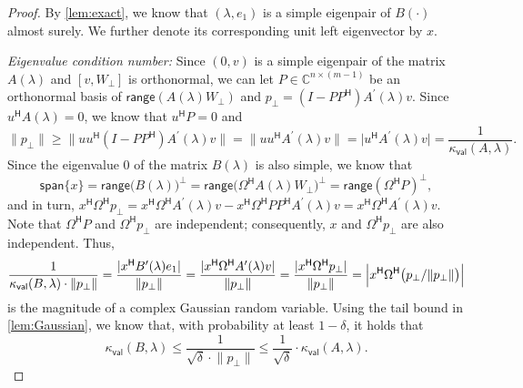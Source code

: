 \documentclass[a4paper,11pt]{article}
\newcommand{\Htran}{\mathsf{H}}
\newcommand{\C}{\mathbb{C}}
\newcommand{\range}{\mathsf{range}}
\newcommand{\kval}{\kappa_{\mathsf{val}}}
\providecommand{\spa}[1]{\mathsf{span}\{#1\}}
\providecommand{\abs}[1]{\lvert#1\rvert}
\providecommand{\norm}[1]{\lVert#1\rVert}
\providecommand{\Bigabs}[1]{\Bigl\lvert#1\Bigr\rvert}
\begin{document}
\begin{proof}
    By \cref{lem:exact}, we know that $(\lambda,e_{1})$ is a simple eigenpair of $B(\cdot)$ almost surely. We further denote its corresponding unit left eigenvector by $x$.
    
    \emph{Eigenvalue condition number:}
    Since $(0,v)$ is a simple eigenpair of the matrix $A(\lambda)$ and $[v,W_{\perp}]$ is orthonormal, we can let $P\in\C^{n\times (m-1)}$ be an orthonormal basis of $\range(A(\lambda)W_{\perp})$ and $p_{\perp} = (I-PP^{\Htran})A^{\prime}(\lambda)v$. Since $u^{\Htran}A(\lambda)=0$, we know that $u^{\Htran}P=0$ and 
    \begin{equation*}
        \norm{p_{\perp}} \geq \norm{uu^{\Htran}(I-PP^{\Htran})A^{\prime}(\lambda)v}= \norm{uu^{\Htran}A^{\prime}(\lambda)v} =  \abs{u^{\Htran}A^{\prime}(\lambda)v} = \frac{1}{\kval(A,\lambda)}.
    \end{equation*}
    Since the eigenvalue $0$ of the matrix $B(\lambda)$ is also simple, we know that  
    \begin{equation*}
        \spa{x} = \range\bigl(B(\lambda)\bigr)^{\perp}=\range\bigl(\Omega^{\Htran}A(\lambda)W_{\perp}\bigr)^{\perp}=\range(\Omega^{\Htran}P)^{\perp},    
    \end{equation*}
    and in turn, $x^{\Htran}\Omega^{\Htran} p_{\perp} = x^{\Htran}\Omega^{\Htran} A^{\prime}(\lambda)v-x^{\Htran}\Omega^{\Htran} PP^{\Htran}A^{\prime}(\lambda)v = x^{\Htran}\Omega^{\Htran} A^{\prime}(\lambda)v$.
    Note that $\Omega^{\Htran}P$ and $\Omega^{\Htran}p_{\perp}$ are independent; consequently, $x$ and $\Omega^{\Htran}p_{\perp}$ are also independent. Thus, 
    \begin{equation*}
        \frac{1}{\kval(B,\lambda)\cdot\norm{p_{\perp}}} = \frac{\abs{x^{\Htran}B^{\prime}(\lambda)e_{1}}}{\norm{p_{\perp}}} = \frac{\abs{x^{\Htran}\Omega^{\Htran}A^{\prime}(\lambda)v}}{\norm{p_{\perp}}} = \frac{\abs{x^{\Htran}\Omega^{\Htran}p_{\perp}}}{\norm{p_{\perp}}} = \Bigabs{x^{\Htran}\Omega^{\Htran}\bigl(p_{\perp}/\norm{p_{\perp}}\bigr)}
    \end{equation*}
    is the magnitude of a complex Gaussian random variable. Using the tail bound in \cref{lem:Gaussian}, we know that, with probability at least $1-\delta$, it holds that 
    \begin{equation*}
        \kval(B,\lambda)\leq  \frac{1}{\sqrt{\delta}\cdot\norm{p_{\perp}}}  \leq \frac{1}{\sqrt{\delta}}\cdot\kval(A,\lambda).
    \end{equation*}


\end{proof}
\end{document}
